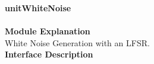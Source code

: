 \documentclass[../../../../doc/ASP-SoC_doc/main.tex]{subfiles}
\begin{document}
\textbf{unitWhiteNoise}
\\\\
\textbf{Module Explanation}
\\
White Noise Generation with an LFSR.
\\
\textbf{Interface Description}
\\
\end{document}
